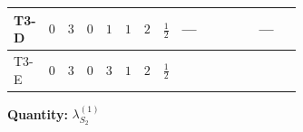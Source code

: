 \documentclass[8pt]{article}
\begin{document}
\begin{landscape}
\begin{longtable}{@{}llcccccc >{\raggedright\arraybackslash}p{0.21\linewidth} >{\raggedright\arraybackslash}p{0.21\linewidth} >{\raggedright\arraybackslash}p{0.21\linewidth}@{}}
\midrule
T3-D & $0$ & $3$ & $0$ & $1$ & $1$ & $2$ & $\frac{1}{2}$ & --- & \scriptsize\adjustbox{max width=\linewidth}{$\begin{gathered} +10 {\lambda_{S_2}^{(1)}}^2\end{gathered}$} & --- \\
\midrule
T3-E & $0$ & $3$ & $0$ & $3$ & $1$ & $2$ & $\frac{1}{2}$ & \scriptsize\adjustbox{max width=\linewidth}{$\begin{gathered} +\frac{3 {\lambda_{HS_2}^{(A)}}^2}{2}\end{gathered}$} & \scriptsize\adjustbox{max width=\linewidth}{$\begin{gathered} +14 {\lambda_{S_2}^{(1)}}^2\end{gathered}$} & \scriptsize\adjustbox{max width=\linewidth}{$\begin{gathered} +26 {\lambda_{S_2}^{(A)}}^2\end{gathered}$} \\
\midrule
\bottomrule
\end{longtable}
\clearpage
\noindent\textbf{Quantity: }$\lambda_{S_2}^{(1)}$\par\smallskip

\end{landscape}
\end{document}
